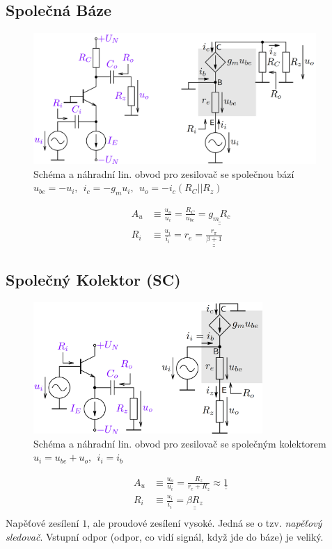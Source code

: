 \documentclass[a4paper,12pt]{article}   %
\begin{document}
\subsection*{Společná Báze}
\begin{figure}[h!]
    \centering
    \includegraphics[height=5cm]{NPN_SB.PNG}
    \caption{Schéma a náhradní lin. obvod pro zesilovač se společnou bází\\\centering$u_{be} = -u_i,~~i_c=-g_mu_i,~~ u_o = -i_c(R_C||R_z)$}
    \label{fig:zes:sb}
\end{figure}
\begin{align}
    A_u &\equiv \frac{u_o}{u_i} = \frac{R_C}{u_{be}} = \underline{\underline{g_mR_c}}\\
    R_i &\equiv \frac{u_i}{i_i} = r_e = \underline{\underline{\frac{r_\pi}{\beta +1}}}
\end{align}

\subsection*{Společný Kolektor (SC)}
\begin{figure}[h!]
    \centering
    \includegraphics[height=5cm]{NPN_SC.PNG}
    \caption{Schéma a náhradní lin. obvod pro zesilovač se společným kolektorem\\\centering$u_i = u_{be}+u_o,~~i_i = i_b$}
    \label{fig:zes:sc}
\end{figure}
\begin{align}
    A_u &\equiv \frac{u_o}{u_i} = \frac{R_z}{r_e+R_z} \approx \underline{\underline{1}}\\
    R_i &\equiv \frac{u_i}{i_i} = \underline{\underline{\beta R_z}}\\
\end{align}
Napěťové zesílení $1$, ale proudové zesílení vysoké. Jedná se o tzv. \textit{napěťový sledovač}. Vstupní odpor (odpor, co vidí signál, když jde do báze) je veliký.
\end{document}
